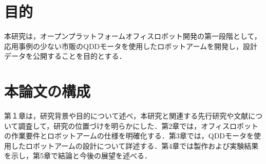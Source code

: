 
\section{目的}
本研究は，オープンプラットフォームオフィスロボット開発の第一段階として，応用事例の少ない市販のQDDモータを使用したロボットアームを開発し，設計データを公開することを目的とする．
\section{本論文の構成}
第１章は，研究背景や目的について述べ，本研究と関連する先行研究や文献について調査して，研究の位置づけを明らかにした．第2章では，オフィスロボットの作業要件とロボットアームの仕様を明確化する．第3章では，QDDモータを使用したロボットアームの設計について詳述する．第4章では製作および実験結果を示し，第5章で結論と今後の展望を述べる．

\newpage